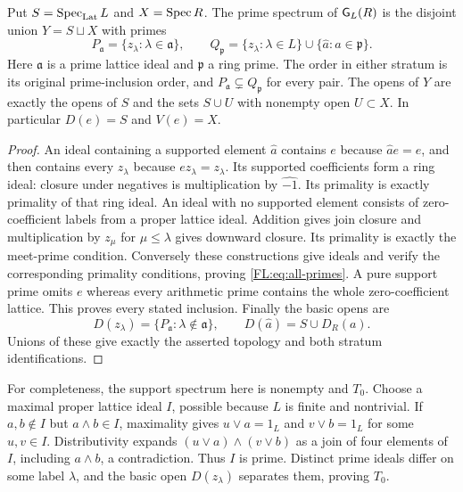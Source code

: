 \begin{proposition}\label{FL:prop:ordinal-spectrum}
Put $S=\operatorname{Spec}_{\rm Lat} L$ and $X=\operatorname{Spec} R$. The prime spectrum of
$\mathsf G_L(R)$ is the disjoint union $Y=S\sqcup X$ with primes
\[
 P_{\mathfrak a}=\{z_\lambda:\lambda\in\mathfrak a\},\qquad
 Q_{\mathfrak p}=\{z_\lambda:\lambda\in L\}
                   \cup\{\widehat a:a\in\mathfrak p\}.
 \tag{FL3}\label{FL:eq:all-primes}
\]
Here $\mathfrak a$ is a prime lattice ideal and $\mathfrak p$ a ring
prime. The order in either stratum is its original prime-inclusion
order, and $P_{\mathfrak a}\subsetneq Q_{\mathfrak p}$ for every pair.
The opens of $Y$ are exactly the opens of $S$ and the sets
$S\cup U$ with nonempty open $U\subset X$. In particular
$D(e)=S$ and $V(e)=X$.
\end{proposition}
\begin{proof}
An ideal containing a supported element $\widehat a$ contains $e$
because $\widehat a e=e$, and then contains every $z_\lambda$ because
$ez_\lambda=z_\lambda$. Its supported coefficients form a ring ideal:
closure under negatives is multiplication by $\widehat{-1}$. Its
primality is exactly primality of that ring ideal. An ideal with no
supported element consists of zero-coefficient labels from a proper
lattice ideal. Addition gives join closure and multiplication by
$z_\mu$ for $\mu\le\lambda$ gives downward closure. Its primality is
exactly the meet-prime condition. Conversely these constructions give
ideals and verify the corresponding primality conditions, proving
\eqref{FL:eq:all-primes}. A pure support prime omits $e$ whereas every
arithmetic prime contains the whole zero-coefficient lattice. This
proves every stated inclusion. Finally the basic opens are
\[
 D(z_\lambda)=\{P_{\mathfrak a}:\lambda\notin\mathfrak a\},\qquad
 D(\widehat a)=S\cup D_R(a).
 \tag{FL4}\label{FL:eq:basic-opens}
\]
Unions of these give exactly the asserted topology and both stratum
identifications.
\end{proof}

For completeness, the support spectrum here is nonempty and $T_0$.
Choose a maximal proper lattice ideal $I$, possible because $L$ is
finite and nontrivial. If $a,b\notin I$ but $a\wedge b\in I$,
maximality gives $u\vee a=1_L$ and $v\vee b=1_L$ for some $u,v\in I$.
Distributivity expands $(u\vee a)\wedge(v\vee b)$ as a join of four
elements of $I$, including $a\wedge b$, a contradiction. Thus $I$
is prime. Distinct prime ideals differ on some label $\lambda$, and
the basic open $D(z_\lambda)$ separates them, proving $T_0$.

